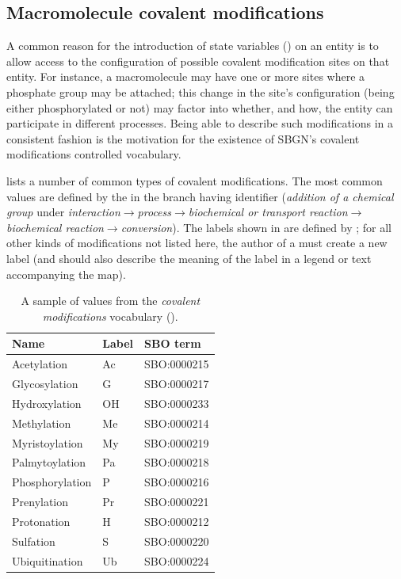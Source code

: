 \subsection{Macromolecule covalent modifications}
\label{sec:covalent-mod-cv}

A common reason for the introduction of state variables
() on an entity is to allow access to the
configuration of possible covalent modification sites on that entity.
For instance, a macromolecule may have one or more sites where a
phosphate group may be attached; this change in the site's
configuration (\ie being either phosphorylated or not) may factor into
whether, and how, the entity can participate in different processes.
Being able to describe such modifications in a consistent fashion is
the motivation for the existence of SBGN's covalent modifications
controlled vocabulary.

 lists a number of common types of covalent
modifications.  The most common values are defined by the \sbo in the
branch having identifier  (\emph{addition of a
  chemical group} under
\emph{interaction}$\rightarrow$\emph{process}$\rightarrow$\emph{biochemical
  or transport reaction}$\rightarrow$\\\emph{biochemical
  reaction}$\rightarrow$\emph{conversion}).  The labels shown in
 are defined by \SBGNPDLone; for all other kinds
of modifications not listed here, the author of a \PD must create a
new label (and should also describe the meaning of the label in a
legend or text accompanying the map).

\begin{table}[h]
  \centering
  \begin{tabular}{l>{\ttfamily}l>{\ttfamily}l}
    \toprule
    \textbf{Name}   & \textbf{\rmfamily Label} & \textbf{\rmfamily SBO term} \\
    \midrule
    Acetylation     & Ac    & SBO:0000215\\
    Glycosylation   & G     & SBO:0000217\\
    Hydroxylation   & OH    & SBO:0000233\\
    Methylation     & Me    & SBO:0000214\\
    Myristoylation  & My    & SBO:0000219\\
    Palmytoylation  & Pa    & SBO:0000218\\
    Phosphorylation & P     & SBO:0000216\\
    Prenylation     & Pr    & SBO:0000221\\
    Protonation     & H     & SBO:0000212\\
    Sulfation       & S     & SBO:0000220\\
    Ubiquitination  & Ub    & SBO:0000224\\
    \bottomrule
  \end{tabular}
  \caption{A sample of values from the \emph{covalent modifications} vocabulary
    ().}
  \label{tab:covalent-mod-cv}
\end{table}



